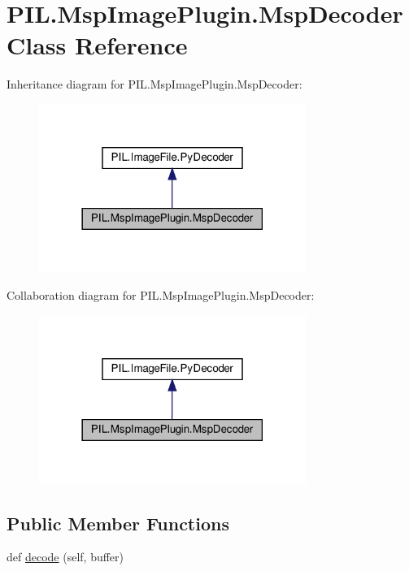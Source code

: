 \hypertarget{classPIL_1_1MspImagePlugin_1_1MspDecoder}{}\section{P\+I\+L.\+Msp\+Image\+Plugin.\+Msp\+Decoder Class Reference}
\label{classPIL_1_1MspImagePlugin_1_1MspDecoder}


Inheritance diagram for P\+I\+L.\+Msp\+Image\+Plugin.\+Msp\+Decoder\+:
\nopagebreak
\begin{figure}[H]
\begin{center}
\leavevmode
\includegraphics[width=246pt]{classPIL_1_1MspImagePlugin_1_1MspDecoder__inherit__graph}
\end{center}
\end{figure}


Collaboration diagram for P\+I\+L.\+Msp\+Image\+Plugin.\+Msp\+Decoder\+:
\nopagebreak
\begin{figure}[H]
\begin{center}
\leavevmode
\includegraphics[width=246pt]{classPIL_1_1MspImagePlugin_1_1MspDecoder__coll__graph}
\end{center}
\end{figure}
\subsection*{Public Member Functions}
\begin{DoxyCompactItemize}
\item 
def \hyperlink{classPIL_1_1MspImagePlugin_1_1MspDecoder_a68374ed831537ec932b07aca4179fcb7}{decode} (self, buffer)
\end{DoxyCompactItemize}

